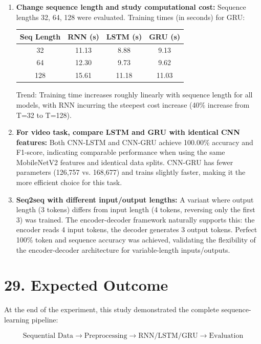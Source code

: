 \documentclass[10pt]{article}
\begin{document}
\begin{enumerate}
\item \textbf{Change sequence length and study computational cost:}
Sequence lengths 32, 64, 128 were evaluated. Training times (in seconds) for GRU:
\begin{center}
\begin{tabular}{|c|c|c|c|}
\hline
\textbf{Seq Length} & \textbf{RNN (s)} & \textbf{LSTM (s)} & \textbf{GRU (s)}\\
\hline
32 & 11.13 & 8.88 & 9.13\\
64 & 12.30 & 9.73 & 9.62\\
128 & 15.61 & 11.18 & 11.03\\
\hline
\end{tabular}
\end{center}
Trend: Training time increases roughly linearly with sequence length for all models, with RNN incurring 
the steepest cost increase (40\% increase from T=32 to T=128).

\item \textbf{For video task, compare LSTM and GRU with identical CNN features:}
Both CNN-LSTM and CNN-GRU achieve 100.00\% accuracy and F1-score, indicating comparable performance 
when using the same MobileNetV2 features and identical data splits. CNN-GRU has fewer parameters 
(126,757 vs. 168,677) and trains slightly faster, making it the more efficient choice for this task.

\item \textbf{Seq2seq with different input/output lengths:}
A variant where output length (3 tokens) differs from input length (4 tokens, reversing only the first 3) 
was trained. The encoder-decoder framework naturally supports this: the encoder reads 4 input tokens, the 
decoder generates 3 output tokens. Perfect 100\% token and sequence accuracy was achieved, validating the 
flexibility of the encoder-decoder architecture for variable-length inputs/outputs.
\end{enumerate}

\section*{29. Expected Outcome}

At the end of the experiment, this study demonstrated the complete sequence-learning pipeline:

\[
\boxed{
\text{Sequential Data}
\rightarrow
\text{Preprocessing}
\rightarrow
\text{RNN/LSTM/GRU}
\rightarrow
\text{Evaluation}
}
\]
\end{document}
